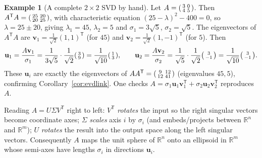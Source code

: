 \documentclass[11pt,oneside]{book}
\theoremstyle{plain}
\theoremstyle{definition}
\newtheorem{example}[theorem]{Example}
\theoremstyle{remark}
\newcommand{\R}{\mathbb{R}}
\newcommand{\T}{^{\mathsf T}}
\newcommand{\bu}{\mathbf{u}}
\newcommand{\bv}{\mathbf{v}}
\begin{document}
\begin{example}[A complete $2\times2$ SVD by hand]\label{ex:svd22}
Let $A=\begin{psmallmatrix}3&0\\4&5\end{psmallmatrix}$.
Then $A\T A=\begin{psmallmatrix}25&20\\20&25\end{psmallmatrix}$, with characteristic
equation $(25-\lambda)^2-400=0$, so $\lambda=25\pm20$, giving $\lambda_1=45$,
$\lambda_2=5$ and $\sigma_1=3\sqrt5$, $\sigma_2=\sqrt5$. The eigenvectors of $A\T A$ are
$\bv_1=\tfrac1{\sqrt2}(1,1)\T$ (for $45$) and $\bv_2=\tfrac1{\sqrt2}(1,-1)\T$ (for $5$).
Then
\[
\bu_1=\frac{A\bv_1}{\sigma_1}=\frac{1}{3\sqrt5}\cdot\frac1{\sqrt2}
\begin{psmallmatrix}3\\9\end{psmallmatrix}=\frac1{\sqrt{10}}
\begin{psmallmatrix}1\\3\end{psmallmatrix},\qquad
\bu_2=\frac{A\bv_2}{\sigma_2}=\frac{1}{\sqrt5}\cdot\frac1{\sqrt2}
\begin{psmallmatrix}3\\-1\end{psmallmatrix}=\frac1{\sqrt{10}}
\begin{psmallmatrix}3\\-1\end{psmallmatrix}.
\]
These $\bu_i$ are exactly the eigenvectors of $AA\T=\begin{psmallmatrix}9&12\\12&41
\end{psmallmatrix}$ (eigenvalues $45,5$), confirming Corollary~\ref{cor:evdlink}. One
checks $A=\sigma_1\bu_1\bv_1\T+\sigma_2\bu_2\bv_2\T$ reproduces $A$.
\end{example}

\begin{geometry_box}
Reading $A=U\Sigma V\T$ right to left: $V\T$ \emph{rotates} the input so the right
singular vectors become coordinate axes; $\Sigma$ \emph{scales} axis $i$ by $\sigma_i$
(and embeds/projects between $\R^n$ and $\R^m$); $U$ \emph{rotates} the result into the
output space along the left singular vectors. Consequently $A$ maps the unit sphere of
$\R^n$ onto an ellipsoid in $\R^m$ whose semi-axes have lengths $\sigma_i$ in directions
$\bu_i$.
\end{geometry_box}
\end{document}
